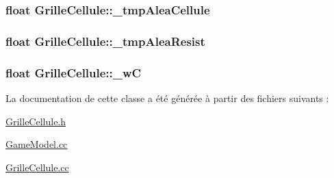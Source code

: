 \hypertarget{classGrilleCellule_a149d801a3a80bd8fd3a472c8f4afa10a}{
\subsubsection[{\_\-tmpAleaCellule}]{\setlength{\rightskip}{0pt plus 5cm}float {\bf GrilleCellule::\_\-tmpAleaCellule}}}
\label{classGrilleCellule_a149d801a3a80bd8fd3a472c8f4afa10a}
\hypertarget{classGrilleCellule_adb1e4b93bc6e7417ebeb5fc0fefbef40}{
\subsubsection[{\_\-tmpAleaResist}]{\setlength{\rightskip}{0pt plus 5cm}float {\bf GrilleCellule::\_\-tmpAleaResist}}}
\label{classGrilleCellule_adb1e4b93bc6e7417ebeb5fc0fefbef40}
\hypertarget{classGrilleCellule_a10bfb046ed5b0973e75b230a5db8d254}{
\subsubsection[{\_\-wC}]{\setlength{\rightskip}{0pt plus 5cm}float {\bf GrilleCellule::\_\-wC}}}
\label{classGrilleCellule_a10bfb046ed5b0973e75b230a5db8d254}


La documentation de cette classe a été générée à partir des fichiers suivants :\begin{DoxyCompactItemize}
\item 
\hyperlink{GrilleCellule_8h}{GrilleCellule.h}\item 
\hyperlink{GameModel_8cc}{GameModel.cc}\item 
\hyperlink{GrilleCellule_8cc}{GrilleCellule.cc}\end{DoxyCompactItemize}
